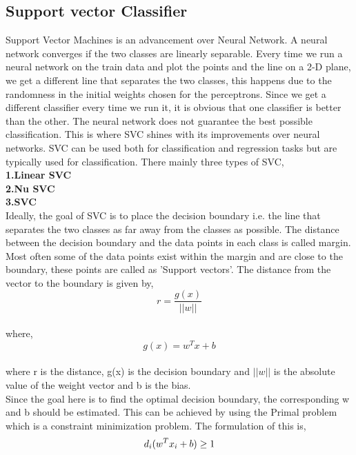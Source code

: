\documentclass[sigconf]{acmart}
\begin{document}
\subsection{Support vector Classifier}
Support Vector Machines is an advancement over Neural Network. A neural network converges if the two classes are linearly separable. Every time we run a neural network on the train data and plot the points and the line on a 2-D plane, we get a different line that separates the two classes, this happens due to the randomness in the initial weights chosen for the perceptrons. Since we get a different classifier every time we run it, it is obvious that one classifier is better than the other. The neural network does not guarantee the best possible classification. This is where SVC shines with its improvements over neural networks. SVC can be used both for classification and regression tasks but are typically used for classification. There mainly three types of SVC,\cite{Williamson2}\\
\textbf{1.Linear SVC}\\
\textbf{2.Nu SVC}\\
\textbf{3.SVC}\\
Ideally, the goal of SVC is to place the decision boundary i.e. the line that separates the two classes as far away from the classes as possible. The distance between the decision boundary and the data points in each class is called margin. Most often some of the data points exist within the margin and are close to the boundary, these points are called as 'Support vectors'. The distance from the vector to the boundary is given by,\cite{Williamson2}\\
\begin{equation}
    r = \frac{g(x)}{||w||}
\end{equation} \\
where,\\
\begin{equation}
    g(x) = w^Tx+b
\end{equation}\\
where r is the distance, g(x) is the decision boundary and $||w||$ is the absolute value of the weight vector and b is the bias.\\
Since the goal here is to find the optimal decision boundary, the corresponding w and b should be estimated. This can be achieved by using the Primal problem which is a constraint minimization problem. The formulation of this is,\cite{Williamson2}\\
\begin{equation}
    d_i(w^Tx_i +b) \geq 1\\
\end{equation}
\end{document}
